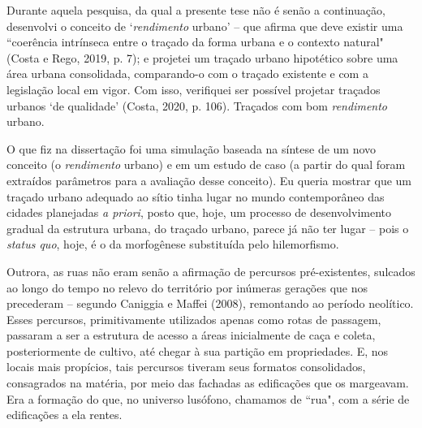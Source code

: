 \documentclass[]{report}
\begin{document}
	Durante aquela pesquisa, da qual a presente tese não é senão a continuação, desenvolvi o conceito de `\textit{rendimento} urbano' – que afirma que deve existir uma ``coerência intrínseca entre o traçado da forma urbana e o contexto natural" (Costa e Rego, 2019, p. 7); e projetei um traçado urbano hipotético sobre uma área urbana consolidada, comparando-o com o traçado existente e com a legislação local em vigor. Com isso, verifiquei ser possível projetar traçados urbanos `de qualidade' (Costa, 2020, p. 106). Traçados com bom \textit{rendimento} urbano. %
	



	O que fiz na dissertação foi uma simulação baseada na síntese de um novo conceito (o \textit{rendimento} urbano) e em um estudo de caso (a partir do qual foram extraídos parâmetros para a avaliação desse conceito). Eu queria mostrar que um traçado urbano adequado ao sítio tinha lugar no mundo contemporâneo das cidades planejadas \textit{a priori}, posto que, hoje, um processo de desenvolvimento gradual da estrutura urbana, do traçado urbano, parece já não ter lugar – pois o \textit{status quo}, hoje, é o da morfogênese substituída pelo hilemorfismo. 
	
	Outrora, as ruas não eram senão a afirmação de percursos pré-existentes, sulcados ao longo do tempo no relevo do território por inúmeras gerações que nos precederam – segundo Caniggia e Maffei (2008), remontando ao período neolítico. Esses percursos, primitivamente utilizados apenas como rotas de passagem, passaram a ser a estrutura de acesso a áreas inicialmente de caça e coleta, posteriormente de cultivo, até chegar à sua partição em propriedades. E, nos locais mais propícios, tais percursos tiveram seus formatos consolidados, consagrados na matéria, por meio das fachadas as edificações que os margeavam. Era a formação do que, no universo lusófono, chamamos de ``rua", com a série de edificações a ela rentes.
	
\end{document}
